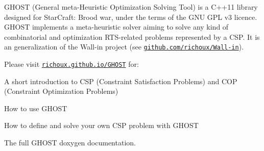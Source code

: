 G\-H\-O\-S\-T (General meta-\/\-Heuristic Optimization Solving Tool) is a C++11 library designed for Star\-Craft\-: Brood war, under the terms of the G\-N\-U G\-P\-L v3 licence. G\-H\-O\-S\-T implements a meta-\/heuristic solver aiming to solve any kind of combinatorial and optimization R\-T\-S-\/related problems represented by a C\-S\-P. It is an generalization of the Wall-\/in project (see \href{https://github.com/richoux/Wall-in}{\tt github.\-com/richoux/\-Wall-\/in}).

Please visit \href{http://richoux.github.io/GHOST}{\tt richoux.\-github.\-io/\-G\-H\-O\-S\-T} for\-:


\begin{DoxyItemize}
\item A short introduction to C\-S\-P (Constraint Satisfaction Problems) and C\-O\-P (Constraint Optimization Problems)
\item How to use G\-H\-O\-S\-T
\item How to define and solve your own C\-S\-P problem with G\-H\-O\-S\-T
\item The full G\-H\-O\-S\-T doxygen documentation. 
\end{DoxyItemize}